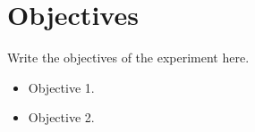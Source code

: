 \section{Objectives}
Write the objectives of the experiment here.
\begin{itemize}
    \item Objective 1.
    \item Objective 2.
\end{itemize}
